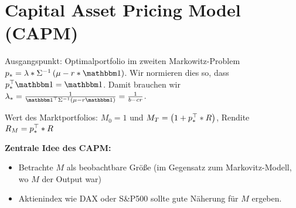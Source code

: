 \section{Capital Asset Pricing Model (CAPM)}

Ausgangspunkt: Optimalportfolio im zweiten Markowitz-Problem $p_\ast = \lambda * \Sigma^{-1}\brackets{\mu - r * \one}$. Wir normieren dies so, dass $\trans{p_\ast} \one = \one$. Damit brauchen wir $\lambda_\ast = \frac{1}{\trans{\one} \Sigma^{-1} \brackets{\mu - r\one}} = \frac{1}{b-cr}$.

Wert des Marktportfolios: $M_0 = 1$ und $M_T = \left( 1 + p_\ast^{\top} * R \right)$, Rendite $R_M = p_\ast^{\top} * R$

\textbf{Zentrale Idee des CAPM:}
\begin{itemize}[nolistsep, topsep=-\parskip]
	\item Betrachte $M$ als beobachtbare Größe (im Gegensatz zum Markovitz-Modell, wo $M$ der Output war)
	\item Aktienindex wie DAX oder S\&P500 sollte gute Näherung  für $M$ ergeben.
\end{itemize}

\vspace{\parskip}

